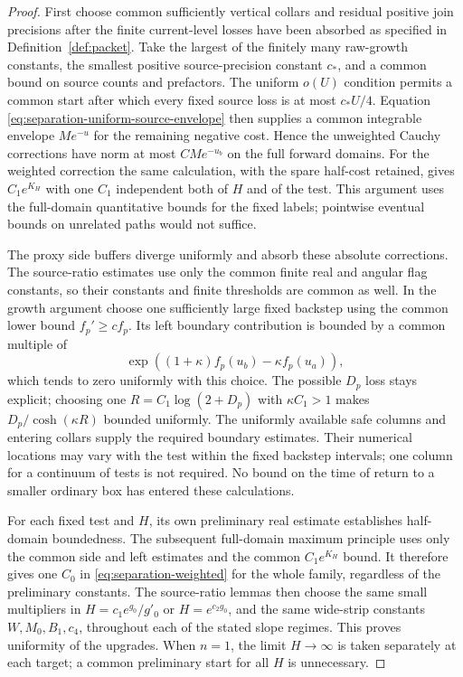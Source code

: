 \begin{proof}
First choose common sufficiently vertical collars and residual
positive join precisions after the finite current-level losses
have been absorbed as specified in Definition~\ref{def:packet}.
Take the largest of the finitely many raw-growth constants,
the smallest positive source-precision constant $c_*$, and a
common bound on source counts and prefactors.  The uniform
$o(U)$ condition permits a common start after which every
fixed source loss is at most $c_*U/4$.  Equation
\eqref{eq:separation-uniform-source-envelope} then supplies
a common integrable envelope $M e^{-u}$ for the remaining
negative cost.  Hence the unweighted Cauchy corrections have
norm at most $CM e^{-u_b}$ on the full forward domains.
For the weighted correction the same calculation, with the
spare half-cost retained, gives $C_1e^{K_H}$ with one $C_1$
independent both of $H$ and of the test.  This argument uses
the full-domain quantitative bounds for the fixed labels;
pointwise eventual bounds on unrelated paths would not suffice.

The proxy side buffers diverge uniformly and absorb these
absolute corrections.  The source-ratio estimates use only
the common finite real and angular flag constants, so their
constants and finite thresholds are common as well.  In the
growth argument choose one sufficiently large fixed backstep
using the common lower bound $f_p'\geq cf_p$.  Its left
boundary contribution is bounded by a common multiple of
\[
 \exp((1+\kappa)f_p(u_b)-\kappa f_p(u_a)),
\]
which tends to zero uniformly with this choice.  The possible
$D_p$ loss stays explicit; choosing one
$R=C_1\log(2+D_p)$ with $\kappa C_1>1$ makes
$D_p/\cosh(\kappa R)$ bounded uniformly.  The uniformly
available safe columns and entering collars supply the required
boundary estimates.  Their numerical locations may vary with
the test within the fixed backstep intervals; one column for a
continuum of tests is not required.  No bound on the time of return to a smaller
ordinary box has entered these calculations.

For each fixed test and $H$, its own preliminary real estimate
establishes half-domain boundedness.  The subsequent full-domain
maximum principle uses only the common side and left estimates
and the common $C_1e^{K_H}$ bound.  It therefore gives one
$C_0$ in \eqref{eq:separation-weighted} for the whole family,
regardless of the preliminary constants.  The source-ratio
lemmas then choose the same small multipliers in
$H=c_1e^{g_0}/g'_0$ or $H=e^{c_2g_0}$, and the same wide-strip
constants $W,M_0,B_1,c_4$, throughout each of the stated slope
regimes.  This proves uniformity of the upgrades.  When $n=1$,
the limit $H\to\infty$ is taken separately at each target;
a common preliminary start for all $H$ is unnecessary.


\end{proof}
